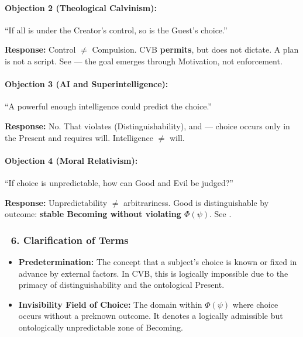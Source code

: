 \documentclass[12pt]{article}
\begin{document}
\paragraph{Objection 2 (Theological Calvinism):}
``If all is under the Creator’s control, so is the Guest’s choice.''

\textbf{Response:}
Control $\neq$ Compulsion. CVB \textbf{permits}, but does not dictate. A plan is not a script. See \text{[16]} — the goal emerges through Motivation, not enforcement.

\bigskip

\paragraph{Objection 3 (AI and Superintelligence):}
``A powerful enough intelligence could predict the choice.''

\textbf{Response:}
No. That violates \text{[5.1]} (Distinguishability), and \text{[19]} — choice occurs only in the Present and requires will. Intelligence $\neq$ will.

\bigskip

\paragraph{Objection 4 (Moral Relativism):}
``If choice is unpredictable, how can Good and Evil be judged?''

\textbf{Response:}
Unpredictability $\neq$ arbitrariness. Good is distinguishable by outcome: \textbf{stable Becoming without violating $\Phi(\psi)$}. See \text{[11.3]}.

\subsubsection*{🔹 6. Clarification of Terms}

\begin{itemize}
\item \textbf{Predetermination:} The concept that a subject’s choice is known or fixed in advance by external factors. In CVB, this is logically impossible due to the primacy of distinguishability and the ontological Present.
\item \textbf{Invisibility Field of Choice:} The domain within $\Phi(\psi)$ where choice occurs without a preknown outcome. It denotes a logically admissible but ontologically unpredictable zone of Becoming.
\end{itemize}
\end{document}
